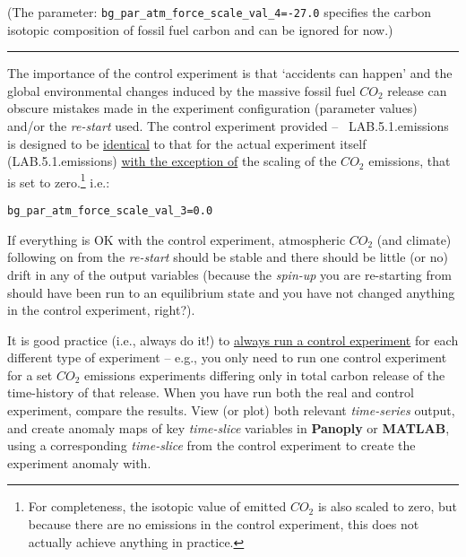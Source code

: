 (The parameter: \texttt{\small bg\_par\_atm\_force\_scale\_val\_4=-27.0} specifies the carbon isotopic composition of fossil fuel carbon and can be ignored for now.)

\vspace{1mm} \noindent\rule{4cm}{0.1mm} \vspace{2mm}

\noindent The importance of the control experiment is that ‘accidents can happen’ and the global environmental changes induced by the massive fossil fuel \(CO_{2}\) release can obscure mistakes made in the experiment configuration (parameter values) and/or the \textit{re-start} used. The control experiment provided -- \textsf{\footnotesize\ LAB.5.1.emissions} is designed to be \uline{identical} to that for the actual experiment itself (\textsf{\footnotesize LAB.5.1.emissions}) \uline{with the exception of} the scaling of the \(CO_{2}\) emissions, that is set to zero.\footnote{For completeness, the isotopic value of emitted $CO_{2}$ is also scaled to zero, but because there are no emissions in the control experiment, this does not actually achieve anything in practice.}  i.e.:
\vspace{-0pt}\small\begin{verbatim}
bg_par_atm_force_scale_val_3=0.0
\end{verbatim}\normalsize\vspace{-2pt}

\vspace{1mm}

If everything is OK with the control experiment, atmospheric \(CO_{2}\) (and climate) following on from the \textit{re-start} should be stable and there should be little (or no) drift in any of the output variables (because the \textit{spin-up} you are re-starting from should have been run to an equilibrium state and you have not changed anything in the control experiment, right?).

\vspace{1mm}

It is good practice (i.e., always do it!) to \uline{always run a control experiment} for each different type of experiment – e.g., you only need to run one control experiment for a set \(CO_{2}\) emissions experiments differing only in total carbon release of the time-history of that release. When you have run both the real and control experiment, compare the results. View (or plot) both relevant \textit{time-series} output, and create anomaly maps of key \textit{time-slice} variables in \textbf{Panoply} or \textbf{MATLAB}, using a corresponding \textit{time-slice} from the control experiment to create the experiment anomaly with.

